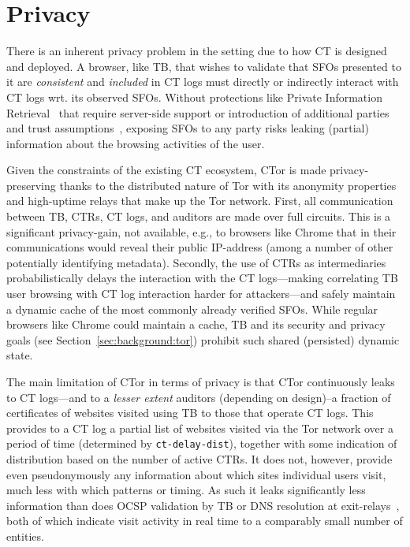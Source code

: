 \section{Privacy} \label{sec:privacy}
There is an inherent privacy problem in the setting due to how CT is designed
and deployed. A browser, like TB, that wishes to validate that SFOs presented to
it are \emph{consistent} and \emph{included} in CT logs must directly or
indirectly interact with CT logs wrt. its observed SFOs. Without protections
like Private Information Retrieval~\cite{PIR} that require server-side support
or introduction of additional parties and trust
assumptions~\cite{lueks-and-goldberg,kales}, exposing SFOs to any party risks
leaking (partial) information about the browsing activities of the user.

Given the constraints of the existing CT ecosystem, CTor is made
privacy-preserving thanks to the distributed nature of Tor with its anonymity
properties and high-uptime relays that make up the Tor network. First, all
communication between TB, CTRs, CT logs, and auditors are made over full
circuits. This is a significant privacy-gain, not available, e.g., to browsers
like Chrome that in their communications would reveal their public IP-address
(among a number of other potentially identifying metadata). Secondly, the use of
CTRs as intermediaries probabilistically delays the interaction with the CT
logs---making correlating TB user browsing with CT log interaction harder for
attackers---and safely maintain a dynamic cache of the most commonly already
verified SFOs. While regular browsers like Chrome could maintain a cache, TB and
its security and privacy goals (see Section~\ref{sec:background:tor}) prohibit
such shared (persisted) dynamic state.

The main limitation of CTor in terms of privacy is that CTor continuously leaks
to CT logs---and to a \emph{lesser extent} auditors (depending on design)--a
fraction of certificates of websites visited using TB to those that operate CT
logs. This provides to a CT log a partial list of websites visited via the Tor
network over a period of time (determined by \texttt{ct-delay-dist}), together
with some indication of distribution based on the number of active CTRs. It does
not, however, provide even pseudonymously any information about which sites
individual users visit, much less with which patterns or timing. As such it
leaks significantly less information than does OCSP validation by TB or DNS
resolution at exit-relays~\cite{TorDNS}, both of which indicate visit activity
in real time to a comparably small number of entities.

